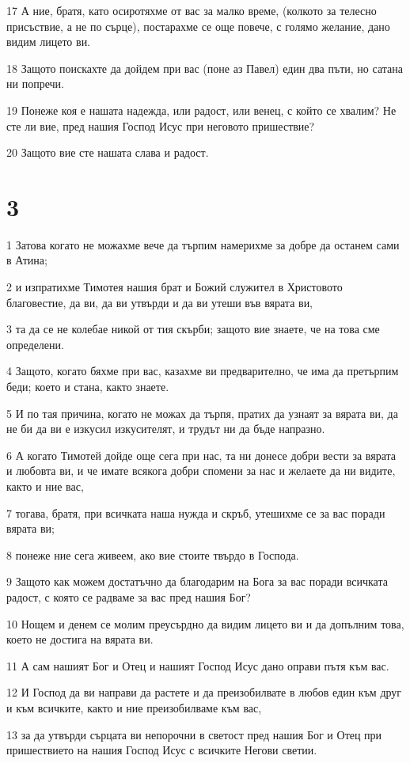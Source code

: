\par 17 А ние, братя, като осиротяхме от вас за малко време, (колкото за телесно присъствие, а не по сърце), постарахме се още повече, с голямо желание, дано видим лицето ви.
\par 18 Защото поискахте да дойдем при вас (поне аз Павел) един два пъти, но сатана ни попречи.
\par 19 Понеже коя е нашата надежда, или радост, или венец, с който се хвалим? Не сте ли вие, пред нашия Господ Исус при неговото пришествие?
\par 20 Защото вие сте нашата слава и радост.

\chapter{3}

\par 1 Затова когато не можахме вече да търпим намерихме за добре да останем сами в Атина;
\par 2 и изпратихме Тимотея нашия брат и Божий служител в Христовото благовестие, да ви, да ви утвърди и да ви утеши във вярата ви,
\par 3 та да се не колебае никой от тия скърби; защото вие знаете, че на това сме определени.
\par 4 Защото, когато бяхме при вас, казахме ви предварително, че има да претърпим беди; което и стана, както знаете.
\par 5 И по тая причина, когато не можах да търпя, пратих да узнаят за вярата ви, да не би да ви е изкусил изкусителят, и трудът ни да бъде напразно.
\par 6 А когато Тимотей дойде още сега при нас, та ни донесе добри вести за вярата и любовта ви, и че имате всякога добри спомени за нас и желаете да ни видите, както и ние вас,
\par 7 тогава, братя, при всичката наша нужда и скръб, утешихме се за вас поради вярата ви;
\par 8 понеже ние сега живеем, ако вие стоите твърдо в Господа.
\par 9 Защото как можем достатъчно да благодарим на Бога за вас поради всичката радост, с която се радваме за вас пред нашия Бог?
\par 10 Нощем и денем се молим преусърдно да видим лицето ви и да допълним това, което не достига на вярата ви.
\par 11 А сам нашият Бог и Отец и нашият Господ Исус дано оправи пътя към вас.
\par 12 И Господ да ви направи да растете и да преизобилвате в любов един към друг и към всичките, както и ние преизобилваме към вас,
\par 13 за да утвърди сърцата ви непорочни в светост пред нашия Бог и Отец при пришествието на нашия Господ Исус с всичките Негови светии.

